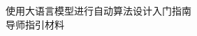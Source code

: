 \documentclass[UTF8,fontset=windows,zihao=-4,scheme=chinese]{ctexart}
\begin{document}
\begin{center}
  {\heiti 使用大语言模型进行自动算法设计入门指南}\\[1.0em]
  {\kaishu 导师指引材料}
\end{center}
\vspace{1em}
\thispagestyle{plain}

{\small\tableofcontents}
\clearpage


\end{document}
